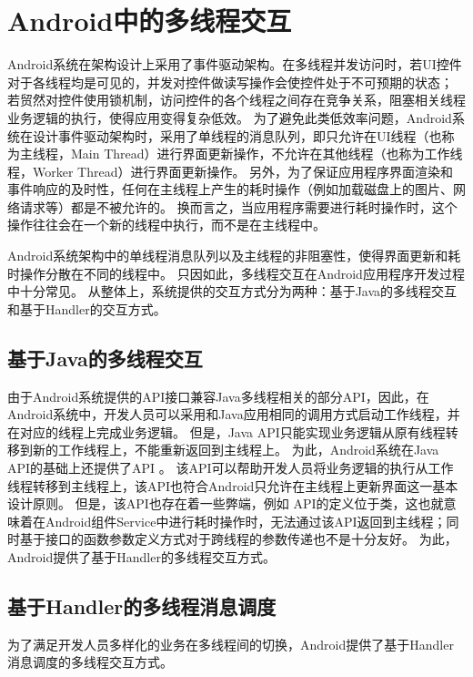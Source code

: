 \section{Android中的多线程交互}
Android系统在架构设计上采用了事件驱动架构。在多线程并发访问时，若UI控件对于各线程均是可见的，并发对控件做读写操作会使控件处于不可预期的状态；
若贸然对控件使用锁机制，访问控件的各个线程之间存在竞争关系，阻塞相关线程业务逻辑的执行，使得应用变得复杂低效。
为了避免此类低效率问题，Android系统在设计事件驱动架构时，采用了单线程的消息队列，即只允许在UI线程（也称为主线程，Main Thread）进行界面更新操作，不允许在其他线程（也称为工作线程，Worker Thread）进行界面更新操作。
另外，为了保证应用程序界面渲染和事件响应的及时性，任何在主线程上产生的耗时操作（例如加载磁盘上的图片、网络请求等）都是不被允许的。
换而言之，当应用程序需要进行耗时操作时，这个操作往往会在一个新的线程中执行，而不是在主线程中。


Android系统架构中的单线程消息队列以及主线程的非阻塞性，使得界面更新和耗时操作分散在不同的线程中。
只因如此，多线程交互在Android应用程序开发过程中十分常见。
从整体上，系统提供的交互方式分为两种：基于Java的多线程交互和基于Handler的交互方式\cite{androidSourceCode}。

\subsection{基于Java的多线程交互}

由于Android系统提供的API接口兼容Java多线程相关的部分API，因此，在Android系统中，开发人员可以采用和Java应用相同的调用方式启动工作线程，并在对应的线程上完成业务逻辑。
但是，Java API只能实现业务逻辑从原有线程转移到新的工作线程上，不能重新返回到主线程上。
为此，Android系统在Java API的基础上还提供了API 。
该API可以帮助开发人员将业务逻辑的执行从工作线程转移到主线程上，该API也符合Android只允许在主线程上更新界面这一基本设计原则。
但是，该API也存在着一些弊端，例如 API的定义位于类，这也就意味着在Android组件Service中进行耗时操作时，无法通过该API返回到主线程；同时基于接口的函数参数定义方式对于跨线程的参数传递也不是十分友好。
为此，Android提供了基于Handler的多线程交互方式。

\subsection{基于Handler的多线程消息调度}

为了满足开发人员多样化的业务在多线程间的切换，Android提供了基于Handler消息调度的多线程交互方式。



